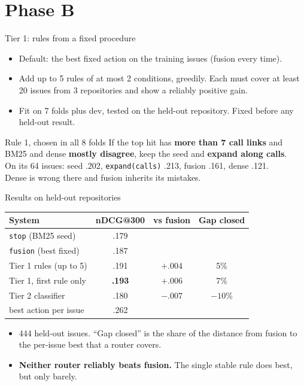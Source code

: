 \documentclass{beamer}
\newcommand{\acn}[1]{\texttt{#1}}
\begin{document}
\section{Phase B}

\begin{frame}{Tier 1: rules from a fixed procedure}
  \begin{itemize}
    \item Default: the best fixed action on the training issues (fusion every time).
    \item Add up to 5 rules of at most 2 conditions, greedily. Each must cover at least 20 issues from 3 repositories and show a reliably positive gain.
    \item Fit on 7 folds plus dev, tested on the held-out repository. Fixed before any held-out result.
  \end{itemize}
  \begin{block}{Rule 1, chosen in all 8 folds}
    If the top hit has \textbf{more than 7 call links} and BM25 and dense \textbf{mostly disagree}, keep the seed and \textbf{expand along calls}.\\[3pt]
    On its 64 issues: seed .202, \acn{expand(calls)} .213, fusion .161, dense .121.\\
    Dense is wrong there and fusion inherits its mistakes.
  \end{block}
\end{frame}

\begin{frame}{Results on held-out repositories}
  \centering
  \begin{tabular}{lccc}
    \toprule
    System & nDCG@300 & vs fusion & Gap closed \\
    \midrule
    \acn{stop} (BM25 seed) & .179 & & \\
    \acn{fusion} (best fixed) & .187 & & \\
    Tier 1 rules (up to 5) & .191 & $+.004$ & 5\% \\
    Tier 1, first rule only & \textbf{.193} & $+.006$ & 7\% \\
    Tier 2 classifier & .180 & $-.007$ & $-10$\% \\
    best action per issue & .262 & & \\
    \bottomrule
  \end{tabular}
  \vspace{6pt}
  \begin{itemize}
    \item 444 held-out issues. ``Gap closed'' is the share of the distance from fusion to the per-issue best that a router covers.
    \item \textbf{Neither router reliably beats fusion.} The single stable rule does best, but only barely.
  \end{itemize}
\end{frame}
\end{document}
